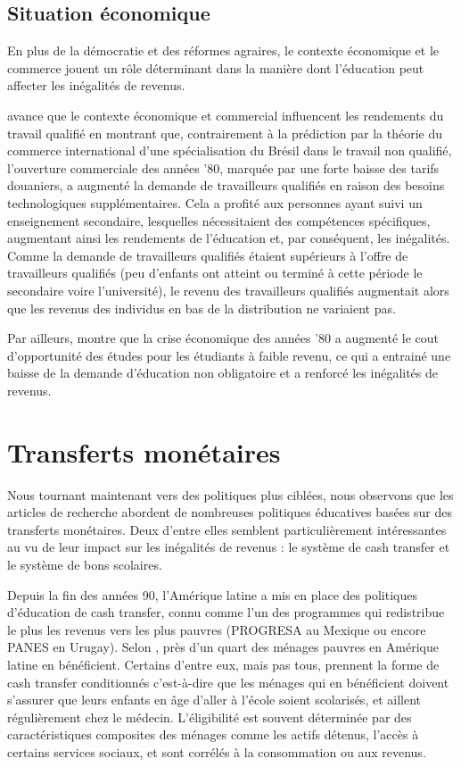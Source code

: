 \documentclass[pagesize, twoside=off, bibliography=totoc, DIV=calc, fontsize=12pt, a4paper, french]{scrartcl}
\begin{document}
\subsection{Situation économique}

En plus de la démocratie et des réformes agraires, le contexte économique et le commerce jouent un rôle déterminant dans la manière dont l’éducation peut affecter les inégalités de revenus. 

 avance que le contexte économique et commercial influencent les rendements du travail qualifié en montrant que, contrairement à la prédiction par la théorie du commerce international d’une spécialisation du Brésil dans le travail non qualifié, l’ouverture commerciale des années ’80, marquée par une forte baisse des tarifs douaniers, a augmenté la demande de travailleurs qualifiés en raison des besoins technologiques supplémentaires. Cela a profité aux personnes ayant suivi un enseignement secondaire, lesquelles nécessitaient des compétences spécifiques, augmentant ainsi les rendements de l’éducation et, par conséquent, les inégalités. Comme la demande de travailleurs qualifiés étaient supérieurs à l’offre de travailleurs qualifiés (peu d’enfants ont atteint ou terminé à cette période le secondaire voire l’université), le revenu des travailleurs qualifiés augmentait alors que les revenus des individus en bas de la distribution ne variaient pas. 

Par ailleurs, \citet{urbina_intergenerational_2018} montre que la crise économique des années ’80 a augmenté le cout d’opportunité des études pour les étudiants à faible revenu, ce qui a entrainé une baisse de la demande d’éducation non obligatoire et a renforcé les inégalités de revenus.

\section{Transferts monétaires}

\label{sec_transferts}

Nous tournant maintenant vers des politiques plus ciblées, nous observons que les articles de recherche abordent de nombreuses politiques éducatives basées sur des transferts monétaires. Deux d’entre elles semblent particulièrement intéressantes au vu de leur impact sur les inégalités de revenus : le système de cash transfer et le système de bons scolaires.

Depuis la fin des années 90, l’Amérique latine a mis en place des politiques d’éducation de cash transfer, connu comme l’un des programmes qui redistribue le plus les revenus vers les plus pauvres (PROGRESA au Mexique ou encore PANES en Urugay). Selon \citet{levy}, près d’un quart des ménages pauvres en Amérique latine en bénéficient. Certains d’entre eux, mais pas tous, prennent la forme de cash transfer conditionnés c’est-à-dire que les ménages qui en bénéficient doivent s’assurer que leurs enfants en âge d’aller à l’école soient scolarisés, et aillent régulièrement chez le médecin. L’éligibilité est souvent déterminée par des caractéristiques composites des ménages comme les actifs détenus, l’accès à certains services sociaux, et sont corrélés à la consommation ou aux revenus.
\end{document}
